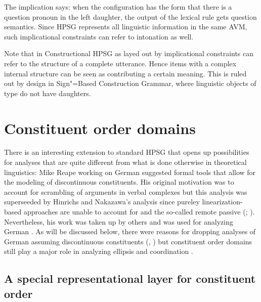 \documentclass[output=paper]{langsci/langscibook}
\begin{document}
The implication says: when the configuration has the form that there is a question pronoun in the
left daughter, the output of the lexical rule gets question semantics. Since HPSG represents all
linguistic information in the same AVM, such implicational constraints can refer to intonation as well.

Note that in Constructional HPSG as layed out by  implicational constraints can refer
to the structure of a complete utterance. Hence items with a complex internal structure can be seen
as contributing a certain meaning. This is ruled out by design in Sign"=Based Construction Grammar,
where linguistic objects of type  do not have daughters.


\section{Constituent order domains}
\label{sec-domains}

There is an interesting extension to standard HPSG that opens up possibilities for analyses that are
quite different from what is done otherwise in theoretical linguistics: Mike Reape
\citeyearpar{Reape91,Reape92a,Reape94a} working on German suggested formal tools that allow for the modeling of
discontinuous constituents. His original motivation was to account for scrambling of arguments in
verbal complexes but this analysis was superseeded by Hinrichs and Nakazawa's analysis
\citep{HN89a,HN94a} since pureley linearization-based approaches are unable to account for 
and the so-called remote passive (\citealp[Section~5.1, Section~5.2]{Kathol98b};
\citealp[Chapter~21.1]{Mueller99a}). Nevertheless, his work was taken up by others and was used for analyzing German
\citep{KP95a,Kathol2000a,Mueller95c,Babel,Mueller2004b,Wetta2011a,Wetta2014a-u}. As will be
discussed below, there were reasons for dropping analyses of German assuming discontinuous constituents
(\citeauthor{Mueller2005d}, \citeyear*{Mueller2005d,MuellerGS})
but constituent order
domains still play a major role in analyzing ellipsis  and
coordination .

\subsection{A special representational layer for constituent order}
\end{document}
